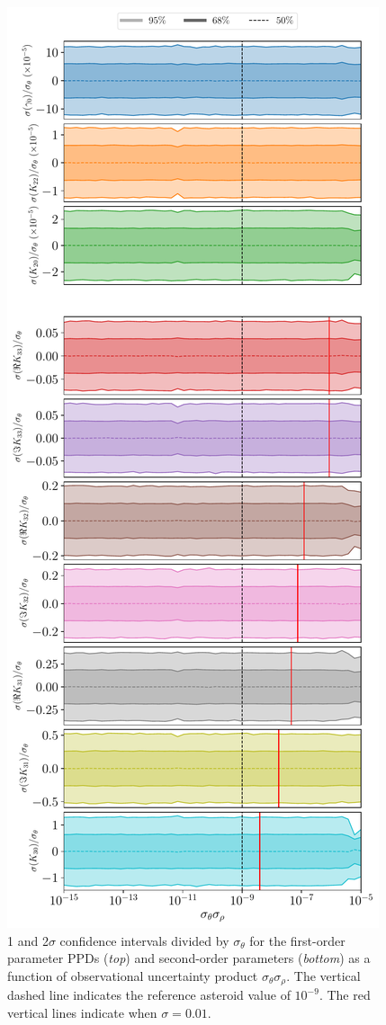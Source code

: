 \documentclass[fleqn,usenatbib]{mnras}
\begin{document}
\begin{figure}
  \centering
  \includegraphics[height=0.89\textheight]{figs/scan-product.pdf}
  \caption{1 and 2$\sigma$ confidence intervals divided by $\sigma_\theta$ for the first-order parameter PPDs (\textit{top}) and second-order parameters (\textit{bottom}) as a function of observational uncertainty product $\sigma_\theta \sigma_\rho$. The vertical dashed line indicates the reference asteroid value of $10^{-9}$. The red vertical lines indicate when $\sigma =0.01$.}
  \label{fig:scan-product}
\end{figure}
\end{document}
